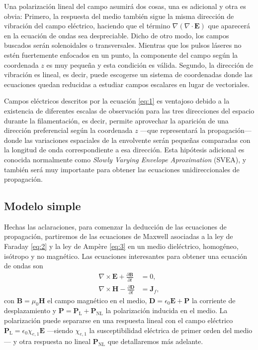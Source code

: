 \documentclass{scrartcl} %
\newcommand*{\pdv}[2]{\frac{\partial#1}{\partial#2}}
\newcommand*{\grad}{\nabla}
\newcommand*{\curl}{{\nabla}\times}
\newcommand*{\diver}{\nabla\cdot}
\begin{document}
Una polarización lineal del campo asumirá dos cosas, una es adicional y otra es obvia: Primero, la respuesta del medio también sigue la misma dirección de vibración del campo eléctrico, haciendo que el término $\grad (\diver \symbf{E})$ que aparecerá en la ecuación de ondas sea despreciable. Dicho de otro modo, los campos buscados serán solenoidales o transversales. Mientras que los pulsos láseres no estén fuertemente enfocados en un punto, la componente del campo según la coordenada $z$ es muy pequeña y esta condición es válida. Segundo, la dirección de vibración es lineal, es decir, puede escogerse un sistema de coordenadas donde las ecuaciones quedan reducidas a estudiar campos escalares en lugar de vectoriales.

Campos eléctricos descritos por la ecuación \eqref{eq:1} es ventajoso debido a la existencia de diferentes escalas de observación para las tres direcciones del espacio durante la filamentación, es decir, permite aprovechar la aparición de una dirección preferencial según la coordenada $z$ ---que representará la propagación--- donde las variaciones espaciales de la envolvente serán pequeñas comparadas con la longitud de onda correspondiente a esa dirección. Esta hipótesis adicional es conocida normalmente como \textit{Slowly Varying Envelope Aproximation} (SVEA), y también será muy importante para obtener las ecuaciones unidireccionales de propagación. 

\subsection{Modelo simple}\label{sec:11}
Hechas las aclaraciones, para comenzar la deducción de las ecuaciones de propagación, partiremos de las ecuaciones de Maxwell asociadas a la ley de Faraday \eqref{eq:2} y la ley de Ampère \eqref{eq:3} en un medio dieléctrico, homogéneo, isótropo y no magnético. Las ecuaciones interesantes para obtener una ecuación de ondas son
\begin{align}
  \curl \symbf{E} + \pdv{\symbf{B}}{t} &= 0, \label{eq:2} \\
  \curl \symbf{H} - \pdv{\symbf{D}}{t} &= \symbf{J}_{f} \label{eq:3},
\end{align}
con $\symbf{B} = \mu_{0} \symbf{H}$ el campo magnético en el medio, $\symbf{D} = \epsilon_{0}\symbf{E} + \symbf{P}$ la corriente de desplazamiento y $\symbf{P} = \symbf{P}_{\mathrm{L}} + \symbf{P}_{\mathrm{NL}}$ la polarización inducida en el medio. La polarización puede separarse en una respuesta lineal con el campo eléctrico $\symbf{P_{\mathrm{L}}} = \epsilon_{0} \chi_{e,1}\symbf{E}$ ---siendo $\chi_{e,1}$ la susceptibilidad eléctrica de primer orden del medio--- y otra respuesta no lineal $\symbf{P_{\mathrm{NL}}}$ que detallaremos más adelante.
\end{document}
